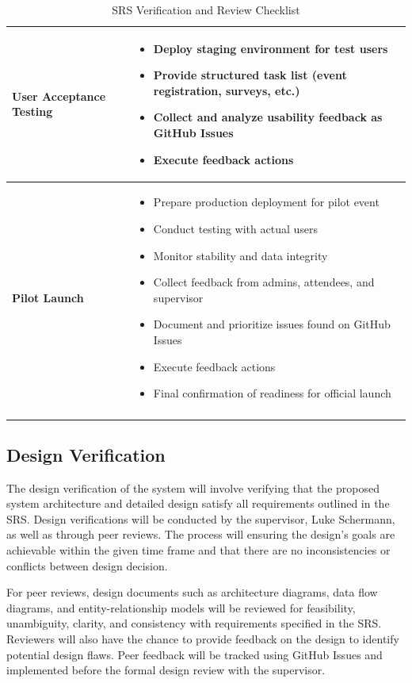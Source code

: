 \documentclass[12pt, titlepage]{article}
\begin{document}
\begin{longtable}{|p{4cm}|p{11cm}|}
\textbf{User Acceptance Testing} &
\begin{itemize}
  \item Deploy staging environment for test users
  \item Provide structured task list (event registration, surveys, etc.)
  \item Collect and analyze usability feedback as GitHub Issues
  \item Execute feedback actions
\end{itemize}
\\
\hline

\textbf{Pilot Launch} &
\begin{itemize}
  \item Prepare production deployment for pilot event
  \item Conduct testing with actual users
  \item Monitor stability and data integrity
  \item Collect feedback from admins, attendees, and supervisor
  \item Document and prioritize issues found on GitHub Issues
  \item Execute feedback actions
  \item Final confirmation of readiness for official launch
\end{itemize}
\\
\hline

\caption{SRS Verification and Review Checklist}
\label{tab:srs_verification_checklist}
\end{longtable}


\subsection{Design Verification}

The design verification of the system will involve verifying that the proposed system architecture and detailed design satisfy all requirements outlined in the SRS. Design verifications will be conducted by the supervisor, Luke Schermann, as well as through peer reviews. The process will ensuring the design's goals are achievable within the given time frame and that there are no inconsistencies or conflicts between design decision.

For peer reviews, design documents such as architecture diagrams, data flow diagrams, and entity-relationship models will be reviewed for feasibility, unambiguity, clarity, and  consistency with requirements specified in the SRS. Reviewers will also have the chance to provide feedback on the design to identify potential design flaws. Peer feedback will be tracked using GitHub Issues and implemented before the formal design review with the supervisor.
\end{document}
